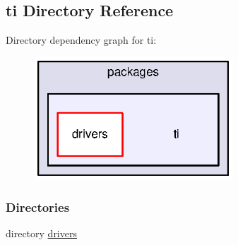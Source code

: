 \subsection{ti Directory Reference}
\label{dir_2a65440169f69d0c886a4ed0b4f15986}
Directory dependency graph for ti\-:
\nopagebreak
\begin{figure}[H]
\begin{center}
\leavevmode
\includegraphics[width=211pt]{dir_2a65440169f69d0c886a4ed0b4f15986_dep}
\end{center}
\end{figure}
\subsubsection*{Directories}
\begin{DoxyCompactItemize}
\item 
directory \hyperlink{dir_2054deab5a2f23ad8f1b385d1b72a49e}{drivers}
\end{DoxyCompactItemize}
